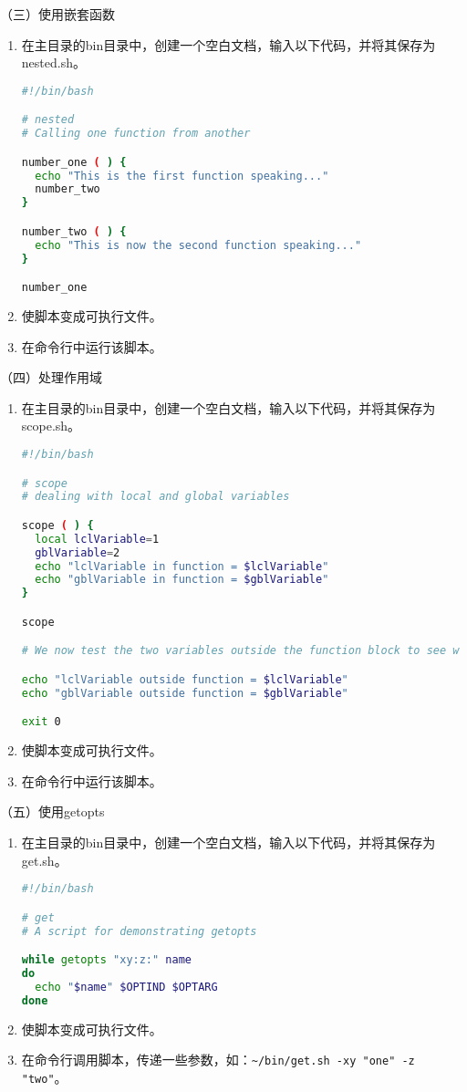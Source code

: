 \vspace{0.1in}
（三）使用嵌套函数
\begin{enumerate}
  \item 在主目录的bin目录中，创建一个空白文档，输入以下代码，并将其保存为nested.sh。
\begin{lstlisting}[language=bash]
#!/bin/bash

# nested
# Calling one function from another

number_one ( ) {
  echo "This is the first function speaking..."
  number_two
}

number_two ( ) {
  echo "This is now the second function speaking..."
}

number_one
\end{lstlisting}
  \item 使脚本变成可执行文件。
  \item 在命令行中运行该脚本。
\end{enumerate}

\vspace{0.1in}
（四）处理作用域
\begin{enumerate}
  \item 在主目录的bin目录中，创建一个空白文档，输入以下代码，并将其保存为scope.sh。
\begin{lstlisting}[language=bash]
#!/bin/bash

# scope
# dealing with local and global variables

scope ( ) {
  local lclVariable=1
  gblVariable=2
  echo "lclVariable in function = $lclVariable"
  echo "gblVariable in function = $gblVariable"
}

scope

# We now test the two variables outside the function block to see what happens

echo "lclVariable outside function = $lclVariable"
echo "gblVariable outside function = $gblVariable"

exit 0
\end{lstlisting}
  \item 使脚本变成可执行文件。
  \item 在命令行中运行该脚本。
\end{enumerate}

\vspace{0.1in}
（五）使用getopts
\begin{enumerate}
  \item 在主目录的bin目录中，创建一个空白文档，输入以下代码，并将其保存为get.sh。
\begin{lstlisting}[language=bash]
#!/bin/bash

# get
# A script for demonstrating getopts

while getopts "xy:z:" name
do
  echo "$name" $OPTIND $OPTARG
done
\end{lstlisting}
  \item 使脚本变成可执行文件。
  \item 在命令行调用脚本，传递一些参数，如：\verb|~/bin/get.sh -xy "one" -z "two"|。
\end{enumerate}


